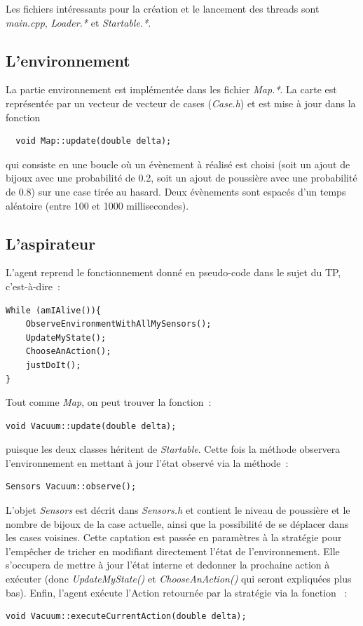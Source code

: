 \documentclass{article}
\begin{document}
Les fichiers intéressants pour la création et le lancement des threads sont
\emph{main.cpp}, \emph{Loader.*} et \emph{Startable.*}.
\subsection{L'environnement}
La partie environnement est implémentée dans les fichier \emph{Map.*}. La carte
est représentée par un vecteur de vecteur de cases (\emph{Case.h}) et est mise à
jour dans la fonction \begin{verbatim}
  void Map::update(double delta);
\end{verbatim}
qui consiste en une boucle où un évènement à réalisé est choisi (soit un ajout
de bijoux avec une probabilité de 0.2, soit un ajout de poussière avec une
probabilité de 0.8) sur une case tirée au hasard. Deux évènements sont espacés
d'un temps aléatoire (entre 100 et 1000 millisecondes).
\subsection{L'aspirateur}
L'agent reprend le fonctionnement donné en pseudo-code dans le sujet du TP,
c'est-à-dire~:
\begin{verbatim}
While (amIAlive()){
    ObserveEnvironmentWithAllMySensors();
    UpdateMyState();
    ChooseAnAction();
    justDoIt();
}
\end{verbatim}
Tout comme \emph{Map}, on peut trouver la fonction~:
\begin{verbatim}
void Vacuum::update(double delta);
\end{verbatim}
puisque les deux classes héritent de \emph{Startable}. Cette fois la méthode
observera l'environnement en mettant à jour l'état observé via la méthode~:
\begin{verbatim}
Sensors Vacuum::observe();
\end{verbatim}
L'objet \emph{Sensors} est décrit dans \emph{Sensors.h} et contient le niveau de
poussière et le nombre de bijoux de la case actuelle, ainsi que la possibilité
de se déplacer dans les cases voisines. Cette captation est passée en paramètres
à la stratégie pour l'empêcher de tricher en modifiant directement l'état de
l'environnement. Elle s'occupera de mettre à jour l'état interne et dedonner la
prochaine action à exécuter (donc \emph{UpdateMyState()} et
\emph{ChooseAnAction()} qui seront expliquées plus bas). Enfin, l'agent exécute
l'Action retournée par la stratégie via la fonction ~:
\begin{verbatim}
void Vacuum::executeCurrentAction(double delta);
\end{verbatim}
\end{document}
